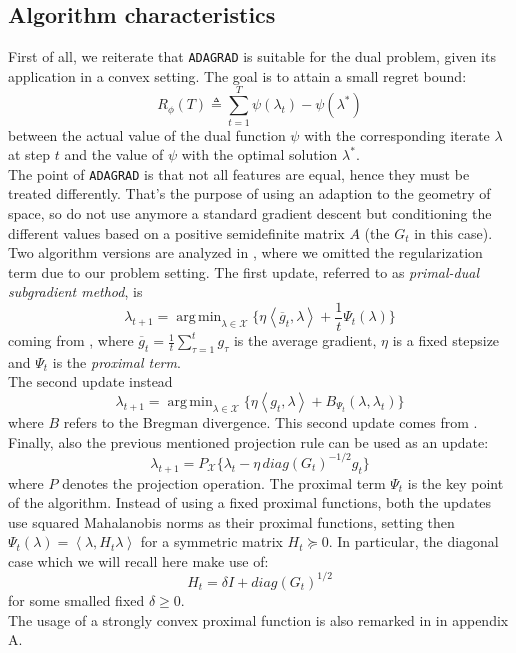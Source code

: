 \documentclass[notitlepage]{article}
\DeclareMathOperator*{\argmin}{arg\,min}
\begin{document}
\subsection{Algorithm characteristics}
First of all, we reiterate that \texttt{ADAGRAD} is suitable for the dual problem, given its application in a convex setting. The goal is to attain a small regret bound:
\begin{equation}
  R_\phi (T) \triangleq \sum_{t=1}^T \psi(\lambda_t) - \psi(\lambda^*)
\end{equation}
between the actual value of the dual function $\psi$ with the corresponding iterate $\lambda$ at step $t$ and the value of $\psi$ with the optimal solution $\lambda^*$.\\
The point of \texttt{ADAGRAD} is that not all features are equal, hence they must be treated differently. That's the purpose of using an adaption to the geometry of space, so do not use anymore a standard gradient descent but conditioning 
the different values based on a positive semidefinite matrix $A$ (the $G_t$ in this case).\\
Two algorithm versions are analyzed in \cite{JMLR:v12:duchi11a}, where we omitted the regularization term due to our problem setting. The first update, referred to as \textit{primal-dual subgradient method}, is 
\begin{equation}
  \lambda_{t+1} = \argmin_{\lambda \in \mathcal{X}} \{ \eta \left\langle \overline{g}_t,\lambda \right\rangle + \frac{1}{t} \Psi_t(\lambda) \}
  \label{eqn:primal-dual-update}
\end{equation}
coming from \cite{NIPS2009_7cce53cf}, where $\overline{g}_t = \frac{1}{t} \sum_{\tau=1}^t g_\tau$ is the average gradient, $\eta$ is a fixed stepsize and $\Psi_t$ is the \textit{proximal term}.\\
The second update instead
\begin{equation}
  \lambda_{t+1} = \argmin_{\lambda \in \mathcal{X}} \{ \eta \left\langle g_t,\lambda \right\rangle + B_{\Psi_t} (\lambda,\lambda_t) \}
  \label{eqn:composite-mirror-update}
\end{equation}
where $B$ refers to the Bregman divergence. This second update comes from \cite{inproceedings}.\\
Finally, also the previous mentioned projection rule can be used as an update:
\begin{equation}
  \lambda_{t+1} = P_{\mathcal{X}} \{ \lambda_t - \eta\, diag(G_t)^{-1/2} g_t \}
  \label{eqn:standard-rule}
\end{equation}
where $P$ denotes the projection operation. The proximal term $\Psi_t$ is the key point of the algorithm. Instead of using a fixed proximal functions, both the updates use squared Mahalanobis norms as their proximal functions, setting then $\Psi_t(\lambda) = \left\langle \lambda,H_t \lambda \right\rangle$ 
for a symmetric matrix $H_t \succeq 0$. In particular, the diagonal case which we will recall here make use of:
\[ H_t = \delta I + diag(G_t)^{1/2} \]
for some smalled fixed $\delta \ge 0$.\\
The usage of a strongly convex proximal function is also remarked in \cite{Frangioni2017} in appendix A.
\end{document}
